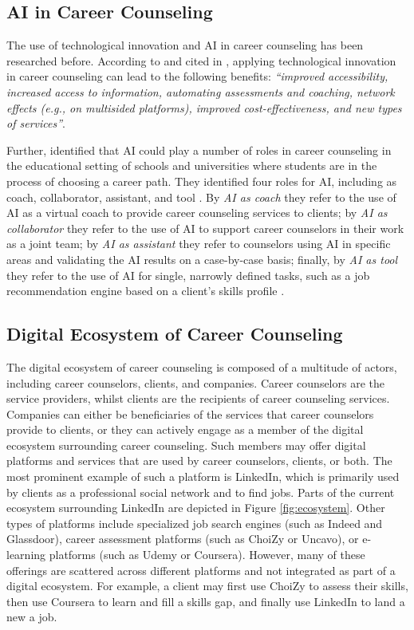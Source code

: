 \subsection{AI in Career Counseling}

The use of technological innovation and AI in career counseling has been researched before. According to
\cite{westmanArtificialIntelligenceCareer2021} and cited in \cite{kaserAIpoweredCareerCounseling2023}, applying
technological innovation in career counseling can lead to the following benefits: \textit{``improved accessibility,
increased access to information, automating assessments and coaching, network effects (e.g., on multisided platforms),
improved cost-effectiveness, and new types of services''}.

Further, \cite{westmanArtificialIntelligenceCareer2021} identified that AI could play a number of roles in career
counseling in the educational setting of schools and universities where students are in the process of choosing a career
path. They identified four roles for AI, including as coach, collaborator, assistant, and tool \citep{westmanArtificialIntelligenceCareer2021}.
By \textit{AI as coach} they refer to the use of AI as a virtual coach to provide career counseling services to clients; by
\textit{AI as collaborator} they refer to the use of AI to support career counselors in their work as a joint team; by
\textit{AI as assistant} they refer to counselors using AI in specific areas and validating the AI results on a case-by-case
basis; finally, by \textit{AI as tool} they refer to the use of AI for single, narrowly defined tasks, such as a job recommendation
engine based on a client's skills profile \citep{westmanArtificialIntelligenceCareer2021}.

\subsection{Digital Ecosystem of Career Counseling}
\label{subsec:ecosystem}

The digital ecosystem of career counseling is composed of a multitude of actors, including career counselors, clients,
and companies. Career counselors are the service providers, whilst clients are the recipients of career counseling services.
Companies can either be beneficiaries of the services that career counselors provide to clients, or they can actively engage
as a member of the digital ecosystem surrounding career counseling. Such members may offer digital platforms and services
that are used by career counselors, clients, or both. The most prominent example of such a platform is LinkedIn, which
is primarily used by clients as a professional social network and to find jobs. Parts of the current ecosystem surrounding
LinkedIn are depicted in Figure \ref{fig:ecosystem}. Other types of platforms include specialized job search engines (such as
Indeed and Glassdoor), career assessment platforms (such as ChoiZy or Uncavo), or e-learning platforms (such as Udemy or Coursera).
However, many of these offerings are scattered across different platforms and not integrated as part of a digital ecosystem. For
example, a client may first use ChoiZy to assess their skills, then use Coursera to learn and fill a skills gap, and finally use
LinkedIn to land a new a job.

